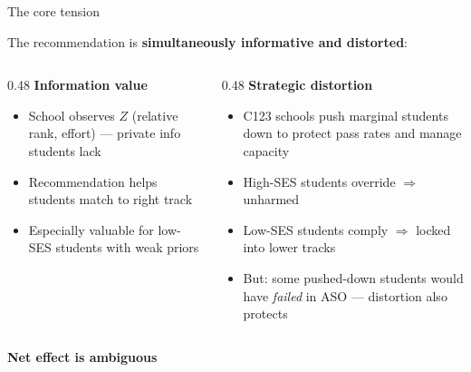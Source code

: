\documentclass[10pt,aspectratio=169]{beamer}
\begin{document}
\begin{frame}{The core tension}
\small

The recommendation is \textbf{simultaneously informative and distorted}:

\bigskip

\begin{columns}[T]
\begin{column}{0.48\textwidth}
\textbf{Information value}
\begin{itemize}\setlength\itemsep{3pt}
  \item School observes $Z$ (relative rank, effort) --- private info students lack
  \item Recommendation helps students match to right track
  \item Especially valuable for low-SES students with weak priors
\end{itemize}
\end{column}

\begin{column}{0.48\textwidth}
\textbf{Strategic distortion}
\begin{itemize}\setlength\itemsep{3pt}
  \item C123 schools push marginal students down to protect pass rates and manage capacity
  \item High-SES students override $\Rightarrow$ unharmed
  \item Low-SES students comply $\Rightarrow$ locked into lower tracks
  \item But: some pushed-down students would have \emph{failed} in ASO --- distortion also protects
\end{itemize}
\end{column}
\end{columns}

\bigskip

\textbf{Net effect is ambiguous} 

\end{frame}
\end{document}
